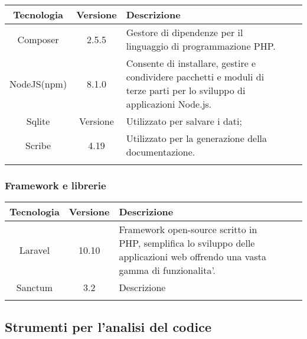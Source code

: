 \begin{center}
\setlength\extrarowheight{5pt}
\renewcommand\tabularxcolumn[1]{>{\Centering}m{#1}}
\begin{tabularx}{\textwidth}{| c | c | X | X | X |} 
	\hline
	\rowcolor{white}
	\textbf{Tecnologia} & \textbf{Versione} & \textbf{Descrizione}\\
	\hline
	Composer & 2.5.5 &  Gestore di dipendenze per il linguaggio di programmazione PHP.\\
	\hline
	NodeJS(npm) & 8.1.0 & Consente di installare, gestire e condividere pacchetti e moduli di terze parti per lo sviluppo di applicazioni Node.js.\\
	\hline
	Sqlite & Versione & Utilizzato per salvare i dati;\\
	\hline
	Scribe & 4.19 & Utilizzato per la generazione della documentazione.\\
	\rowcolor{white}
	\caption{Strumenti utilizzati}
	\end{tabularx}
\end{center}

\subsubsection{Framework e librerie}

\begin{center}
\setlength\extrarowheight{5pt}
\renewcommand\tabularxcolumn[1]{>{\Centering}m{#1}}
\begin{tabularx}{\textwidth}{| c | c | X | X | X |} 
	\hline
	\rowcolor{white}
	\textbf{Tecnologia} & \textbf{Versione} & \textbf{Descrizione}\\
	\hline
	Laravel & 10.10 & Framework open-source scritto in PHP, semplifica lo sviluppo delle applicazioni web offrendo una vasta gamma di funzionalita'.\\
	\hline
	Sanctum & 3.2 & Descrizione\\
	\hline
	\rowcolor{white}
	\caption{Framework e librerie utilizzati}
	\end{tabularx}
\end{center}

\subsection{Strumenti per l’analisi del codice}

